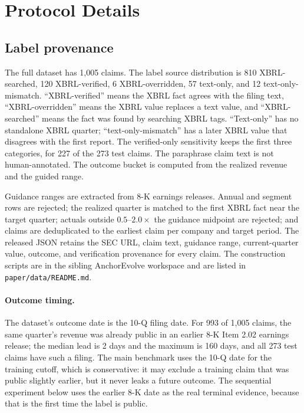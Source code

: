 \documentclass[11pt]{article}
\begin{document}
\section{Protocol Details}
\label{app:protocol}

\subsection{Label provenance}
The full dataset has 1,005 claims. The label source distribution is 810 XBRL-searched, 120 XBRL-verified, 6 XBRL-overridden, 57 text-only, and 12 text-only-mismatch. ``XBRL-verified'' means the XBRL fact agrees with the filing text, ``XBRL-overridden'' means the XBRL value replaces a text value, and ``XBRL-searched'' means the fact was found by searching XBRL tags. ``Text-only'' has no standalone XBRL quarter; ``text-only-mismatch'' has a later XBRL value that disagrees with the first report. The verified-only sensitivity keeps the first three categories, for 227 of the 273 test claims. The paraphrase claim text is not human-annotated. The outcome bucket is computed from the realized revenue and the guided range.

Guidance ranges are extracted from 8-K earnings releases. Annual and segment
rows are rejected; the realized quarter is matched to the first XBRL fact near
the target quarter; actuals outside $0.5$--$2.0\times$ the guidance midpoint are
rejected; and claims are deduplicated to the earliest claim per company and
target period. The released JSON retains the SEC URL, claim text, guidance
range, current-quarter value, outcome, and verification provenance for every
claim. The construction scripts are in the sibling AnchorEvolve workspace and
are listed in \texttt{paper/data/README.md}.

\paragraph{Outcome timing.}
The dataset's outcome date is the 10-Q filing date. For 993 of 1,005 claims,
the same quarter's revenue was already public in an earlier 8-K Item 2.02
earnings release; the median lead is 2 days and the maximum is 160 days, and
all 273 test claims have such a filing. The main benchmark uses the 10-Q date
for the training cutoff, which is conservative: it may exclude a training
claim that was public slightly earlier, but it never leaks a future outcome.
The sequential experiment below uses the earlier 8-K date as the real terminal
evidence, because that is the first time the label is public.
\end{document}
